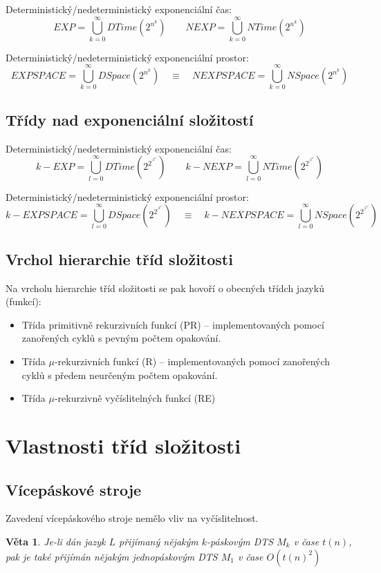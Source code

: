 \documentclass[a4paper, 11pt]{report}
\newtheorem{veta}{Věta}[chapter]
\begin{document}
Deterministický/nedeterministický exponenciální čas:
$$EXP = \bigcup\limits_{k=0}^\infty DTime(2^{n^k}) \quad \quad
NEXP = \bigcup\limits_{k=0}^\infty NTime(2^{n^k})$$

Deterministický/nedeterministický exponenciální prostor:
$$EXPSPACE = \bigcup\limits_{k=0}^\infty DSpace(2^{n^k})
\quad \equiv \quad
NEXPSPACE = \bigcup\limits_{k=0}^\infty NSpace(2^{n^k})$$

\subsection{Třídy nad exponenciální složitostí}

Deterministický/nedeterministický exponenciální čas:
$$k-EXP = \bigcup\limits_{l=0}^\infty DTime(2^{2^{\vdots^{2^{n^l}}}})
\quad \quad
k-NEXP = \bigcup\limits_{l=0}^\infty NTime(2^{2^{\vdots^{2^{n^l}}}})$$

Deterministický/nedeterministický exponenciální prostor:
$$k-EXPSPACE = \bigcup\limits_{l=0}^\infty DSpace(2^{2^{\vdots^{2^{n^l}}}})
\quad \equiv \quad
k-NEXPSPACE = \bigcup\limits_{l=0}^\infty NSpace(2^{2^{\vdots^{2^{n^l}}}})$$

\subsection{Vrchol hierarchie tříd složitosti}
Na vrcholu hierarchie tříd složitosti se pak hovoří o obecných třídch jazyků (funkcí):
\begin{itemize}
	\item Třída primitivně rekurzivních funkcí (PR) -- implementovaných pomocí zanořených cyklů s pevným počtem opakování.
	\item Třída $\mu$-rekurzivních funkcí (R) -- implementovaných pomocí zanořených cyklů s předem neurčeným počtem opakování.
	\item Třída $\mu$-rekurzivně vyčíslitelných funkcí (RE)
\end{itemize}

\section{Vlastnosti tříd složitosti}
\subsection{Vícepáskové stroje}
Zavedení vícepáskového stroje nemělo vliv na vyčíslitelnost. 

\begin{veta}
Je-li dán jazyk $L$ přijímaný nějakým $k$-páskovým DTS $M_k$ v čase $t(n)$, pak je také přijímán nějakým jednopáskovým DTS $M_1$ v čase $O(t(n)^2)$
\end{veta}
\end{document}

